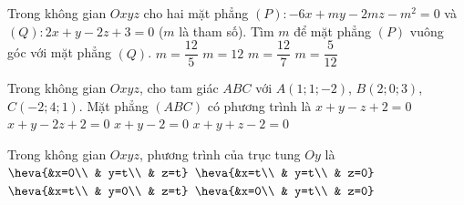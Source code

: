 \begin{ex}%
	Trong không gian $Oxyz$ cho hai mặt phẳng $ (P)\colon -6x+my-2mz-m^{2}=0 $ và $ (Q)\colon 2x+y-2z+3=0 $ ($m$ là tham số). Tìm $m$ để mặt phẳng $(P)$ vuông góc với mặt phẳng $(Q)$.
	\choice
	{\True $ m=\dfrac{12}{5} $}
	{$ m=12 $}
	{$ m=\dfrac{12}{7} $}
	{$ m=\dfrac{5}{12} $}
\end{ex}

\begin{ex}%
	Trong không gian $Oxyz$, cho tam giác $ABC$ với $A\left(1;1;-2 \right) $, $B\left( 2;0;3\right) $, $C(-2;4;1)$. Mặt phẳng
	$(ABC)$ có phương trình là
	\choice
	{$x+y-z+2=0$}
	{$x+y-2z+2=0$}
	{\True $x+y-2=0$}
	{$x+y+z-2=0$}
\end{ex}

\begin{ex}%
	Trong không gian $Oxyz$, phương trình của trục tung $Oy$ là
	\choice
	{$\heva{&x=0\\ & y=t\\ & z=t}$}
	{$\heva{&x=t\\ & y=t\\ & z=0}$}
	{$\heva{&x=t\\ & y=0\\ & z=t}$}
	{\True $\heva{&x=0\\ & y=t\\ & z=0}$}
	\loigiai{
	}
\end{ex}

